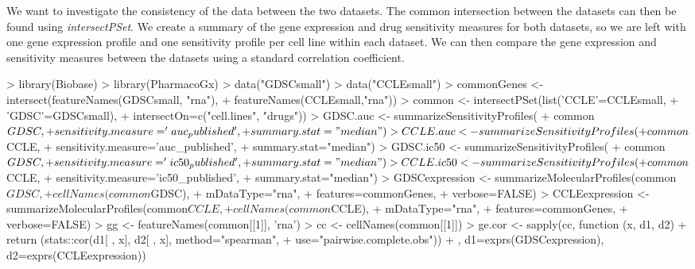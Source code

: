 \documentclass[11pt]{article}
\begin{document}
We want to investigate the consistency of the data between the two datasets. The common intersection between the datasets can then be found using \textit{intersectPSet}. We create a summary of the gene expression and drug sensitivity measures for both datasets, so we are left with one gene expression profile and one sensitivity profile per cell line within each dataset. We can then compare the gene expression and sensitivity measures between the datasets using a standard correlation coefficient. 

\begin{Schunk}
\begin{Sinput}
>   library(Biobase)
>   library(PharmacoGx)
>   data("GDSCsmall")
>   data("CCLEsmall")
>   commonGenes <- intersect(featureNames(GDSCsmall, "rna"),
+                            featureNames(CCLEsmall,"rna"))
>   common <- intersectPSet(list('CCLE'=CCLEsmall,
+                                'GDSC'=GDSCsmall),
+                           intersectOn=c("cell.lines", "drugs"))
>   GDSC.auc <- summarizeSensitivityProfiles(
+                 common$GDSC,
+                 sensitivity.measure='auc_published', 
+                 summary.stat="median")
>   CCLE.auc <- summarizeSensitivityProfiles(
+                 common$CCLE,
+                 sensitivity.measure='auc_published', 
+                 summary.stat="median")
>   GDSC.ic50 <- summarizeSensitivityProfiles(
+                 common$GDSC, 
+                 sensitivity.measure='ic50_published', 
+                 summary.stat="median")
>   CCLE.ic50 <- summarizeSensitivityProfiles(
+                 common$CCLE, 
+                 sensitivity.measure='ic50_published', 
+                 summary.stat="median")
>   GDSCexpression <- summarizeMolecularProfiles(common$GDSC, 
+                                         cellNames(common$GDSC),
+                                         mDataType="rna",
+                                         features=commonGenes,
+                                         verbose=FALSE)
>   CCLEexpression <- summarizeMolecularProfiles(common$CCLE, 
+                                          cellNames(common$CCLE),
+                                          mDataType="rna",
+                                          features=commonGenes,
+                                          verbose=FALSE)
>   gg <- featureNames(common[[1]], 'rna')
>   cc <- cellNames(common[[1]])
>   ge.cor <- sapply(cc, function (x, d1, d2) {
+     return (stats::cor(d1[ , x], d2[ , x], method="spearman",
+                 use="pairwise.complete.obs"))
+   }, d1=exprs(GDSCexpression), d2=exprs(CCLEexpression))

\end{Sinput}
\end{Schunk}
\end{document}
